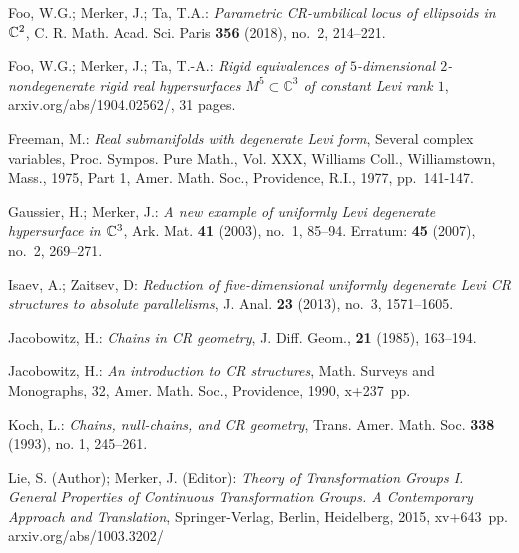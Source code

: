 \begin{thebibliography}{XL}
{\smallskip

Foo, W.G.; Merker, J.; Ta, T.A.:
{\em Parametric CR-umbilical locus of ellipsoids in $\mathbb{C}^2$},
C. R. Math. Acad. Sci. Paris {\bf 356} (2018), no.~2, 214--221.

\smallskip

Foo, W.G.; Merker, J.; Ta, T.-A.:
{\em Rigid equivalences of $5$-dimensional $2$-nondegenerate
rigid real hypersurfaces $M^{5}\subset\mathbb{C}^{3}$ 
of constant Levi rank $1$},
{\tiny\sf arxiv.org/abs/1904.02562/},
31 pages.

\smallskip

Freeman, M.:
{\em Real submanifolds with degenerate Levi form}, 
Several complex variables, Proc. Sympos. Pure Math., Vol.
XXX, Williams Coll., Williamstown, Mass., 1975,
Part 1, Amer. Math. Soc., Providence, R.I., 1977, pp.~141-147.

\smallskip

Gaussier, H.; Merker, J.:
{\em A new example of uniformly Levi degenerate hypersurface in 
$\mathbb{C}^3$}, Ark. Mat. {\bf 41} (2003), no.~1, 85--94.
Erratum: {\bf 45} (2007), no.~2, 269--271.

\smallskip

Isaev, A.; Zaitsev, D:
{\em Reduction of five-dimensional uniformly degenerate 
Levi CR structures to absolute parallelisms}, 
J. Anal. {\bf 23} (2013), no.~3, 1571--1605.

\smallskip

Jacobowitz, H.:
{\em Chains in CR geometry},
J. Diff. Geom., {\bf 21} (1985), 163--194.

\smallskip

Jacobowitz, H.:
{\em An introduction to CR structures}, 
Math. Surveys and Monographs, 32, Amer. Math. Soc., Providence, 1990,
x+237~pp.

\smallskip

Koch, L.:
{\em Chains, null-chains, and CR geometry},
Trans. Amer. Math. Soc. {\bf 338} (1993), no. 1, 245--261. 

\smallskip

Lie, S. (Author); Merker, J. (Editor):
{\em Theory of Transformation Groups I. 
General Properties of Continuous Transformation Groups. 
A Contemporary Approach and Translation}, 
Springer-Verlag, Berlin, Heidelberg, 2015, xv+643~pp.
{\tiny\sf arxiv.org/abs/1003.3202/}

}
\end{thebibliography}
